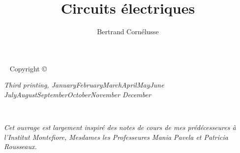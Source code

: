 \documentclass[justified, a4paper]{tufte-book}
\title{Circuits électriques}
\author[Bertrand Cornélusse]{Bertrand Cornélusse}
\newcommand{\monthyear}{%
  \ifcase\month\or January\or February\or March\or April\or May\or June\or
  July\or August\or September\or October\or November\or
  December\fi\space\number\year
}
\begin{document}
\frontmatter


\maketitle


\newpage
\begin{fullwidth}
~\vfill
\thispagestyle{empty}
\setlength{\parindent}{0pt}
\setlength{\parskip}{\baselineskip}
Copyright \copyright\ \the\year\ \thanklessauthor

\par{}

\par{}


\par\textit{Third printing, \monthyear}
\end{fullwidth}

\tableofcontents

\listoftodos



\cleardoublepage
~\vfill
\begin{doublespace}
\noindent\fontsize{14}{18}\selectfont\itshape
\nohyphenation
Cet ouvrage est largement inspiré des notes de cours de mes prédécesseures à l'Institut Montefiore, Mesdames les Professeures Mania Pavela et Patricia Rousseaux.
\end{doublespace}
\vfill
\vfill




\mainmatter

















\backmatter






\nocite{*}

\end{document}
